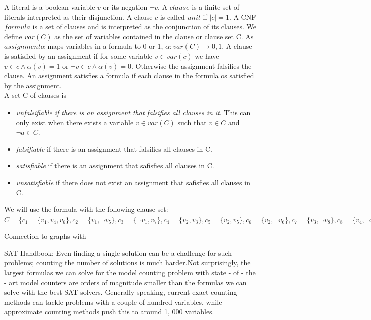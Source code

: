 \documentclass[a4paper, 12pt, bibliography=totoc]{scrartcl}
\begin{document}
A literal is a boolean variable $v$ or its negation $\neg v$. A $clause$ is a finite set of literals interpreted as their disjunction. A clause $c$ is called $unit$ if $|c|=1$. A CNF $formula$ is a set of clauses and is interpreted as the conjunction of its clauses. We define $var(C)$ as the set of variables contained in the clause or clause set C. As $assignment \alpha$ maps variables in a formula to 0 or 1, $\alpha : var(C)\rightarrow 0,1$. A clause is satisfied by an assignment if for some variable $v \in var(c)$ we have $v \in c \land \alpha (v)=1$ {or} $\neg v \in c \land \alpha(v)=0$. Otherwise the assignment falsifies the clause. An assignment satisfies a formula if each clause in the formula os satisfied by the assignment. \\
A set C of clauses is 
\begin{itemize}
	\renewcommand{\labelitemi}{-}
	\item \textit{unfalsifiable if there is an assignment that falsifies all clauses in it}. This can only exist when there exists a variable $v \in var(C)$ such that $v \in C$ and $\neg a \in C$. 
	\item \textit{falsifiable} if there is an assignment that falsifies all clauses in C.
	\item \textit{satisfiable} if there is an assignment that safisfies all clauses in C.
	\item \textit{unsatisfiable} if there does not exist an assignment that safisfies all clauses in C.
\end{itemize}

\begin{example}[\label{ex:example41}]
	We will use the formula with the following clause set: $C=\{c_{1}=\{v_{1},v_{4},v_{6}\},
	c_{2}=\{v_{1},\neg v_{5}\},
	c_{3}=\{\neg v_{1},v_{7}\},
	c_{4}=\{v_{2},v_{3}\},
	c_{5}=\{v_{2},v_{5}\},
	c_{6}=\{v_{2},\neg v_{6}\},
	c_{7}=\{v_{3},\neg v_{8}\},
	c_{8}=\{v_{4},\neg v_{8}\},
	c_{9}=\{\neg v_{4},v_{6}\},
	c_{10}=\{\neg v_{4},v_{7}\}\}$
\end{example}

Connection to graphs with \cite{DiplomarbeitZisser}

SAT Handbook:
Even finding a single solution can be a challenge
for such problems; counting the number of solutions is much harder.Not
surprisingly, the largest formulas we can solve for the model counting problem
with state - of - the - art model counters are orders of magnitude smaller than the
formulas we can solve with the best SAT solvers. Generally speaking, current
exact counting methods can tackle problems with a couple of hundred variables, while approximate counting methods push this to around 1, 000 variables.
\end{document}
